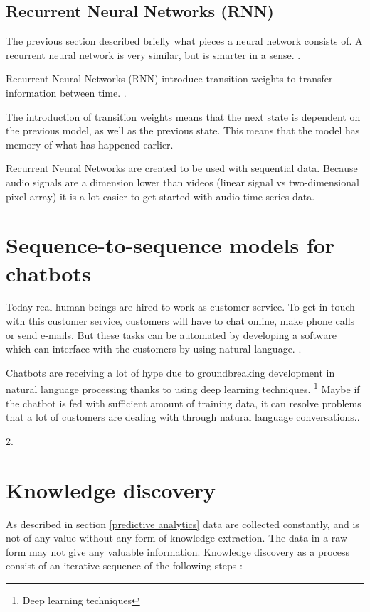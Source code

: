 \documentclass[english, a4paper]{report}
\begin{document}
{{        \subsection{Recurrent Neural Networks (RNN)}\label{recurrrent neural networks}
        {
            The previous section described briefly what pieces a neural network consists of. A recurrent neural network is very similar, but is smarter in a sense. \cite{}.
            \par
            Recurrent Neural Networks (RNN) introduce transition weights to transfer information between time.
            \cite{}.
            \par
            The introduction of transition weights means that the next state is dependent on the previous model, as well as the previous state. This means that the model has memory of what has happened earlier.
            \par
            Recurrent Neural Networks are created to be used with sequential data. Because audio signals are a dimension lower than videos (linear signal vs two-dimensional pixel array) it is a lot easier to get started with audio time series data.
        }
    }
    
    \section{Sequence-to-sequence models for chatbots}\label{sequence-to-sequence models}
    {
        Today real human-beings are hired to work as customer service. To get in touch with this customer service, customers will have to chat online, make phone calls or send e-mails. But these tasks can be automated by developing a software which can interface with the customers by using natural language. \cite{}.
        \par
        Chatbots are receiving a lot of hype due to groundbreaking development in natural language processing thanks to using deep learning techniques. \footnote{Deep learning techniques } Maybe if the chatbot is fed with sufficient amount of training data, it can resolve problems that a lot of customers are dealing with through natural language conversations.\cite{}. 
        \par
        
        \par
        
         \ref{KnowledgeDiscovery}.
    }
    
    \section{Knowledge discovery}\label{KnowledgeDiscovery}
    {
        As described in section \ref{predictive analytics} data are collected constantly, and is not of any value without any form of knowledge extraction. The data in a raw form may not give any valuable information. Knowledge discovery as a process consist of an iterative sequence of the following steps \cite{dataMining}:
        
}}
\end{document}
